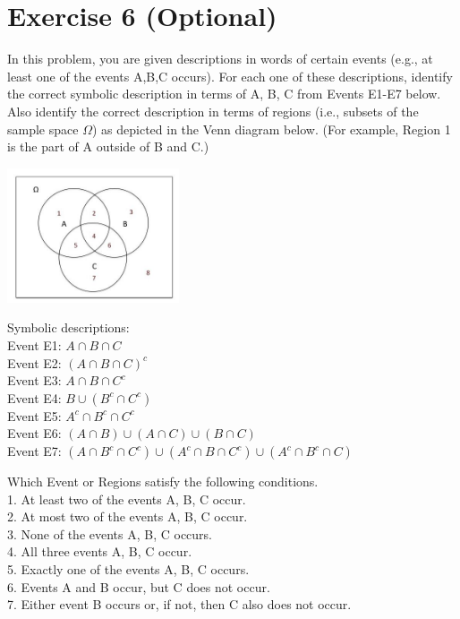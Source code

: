 \documentclass[12pt,thmsa]{article}
\begin{document}
\section*{Exercise 6 (Optional)}
In this problem, you are given descriptions in words of certain events (e.g., at least one of the events A,B,C occurs). For each one of these descriptions, identify the correct symbolic description in terms of A, B, C from Events E1-E7 below. Also identify the correct description in terms of regions (i.e., subsets of the sample space $\Omega$) as depicted in the Venn diagram below. (For example, Region 1 is the part of A outside of B and C.)
\begin{center}
\includegraphics[width = 2in]{images1.jpg}
\end{center}

\noindent Symbolic descriptions: \\
Event E1: $A \cap B \cap C$ \\
Event E2: $(A\cap B \cap C)^c $ \\
Event E3: $ A \cap B \cap C^c $ \\
Event E4: $B \cup (B^c \cap C^c)$ \\
Event E5: $A^c \cap B^c \cap C^c $ \\
Event E6: $(A \cap B) \cup (A \cap C) \cup (B \cap C)$ \\
Event E7: $(A \cap B^c \cap C^c) \cup (A^c \cap B \cap C^c) \cup (A^c \cap B^c \cap C) $

\noindent Which Event or Regions satisfy the following conditions. \\
1. At least two of the events A, B, C occur. \\
2. At most two of the events A, B, C occur. \\
3. None of the events A, B, C occurs. \\
4. All three events A, B, C occur. \\
5. Exactly one of the events A, B, C occurs.\\
6. Events A and B occur, but C does not occur. \\
7. Either event B occurs or, if not, then C also does not occur.
\end{document}
